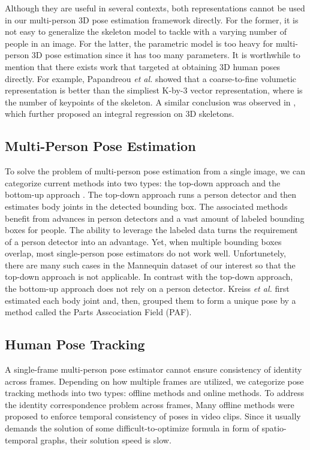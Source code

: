 \documentclass{article}
\begin{document}
Although they are useful in several contexts, both representations
cannot be used in our multi-person 3D pose estimation framework
directly. For the former, it is not easy to generalize the skeleton
model to tackle with a varying number of people in an image. For the
latter, the parametric model is too heavy for multi-person 3D pose
estimation since it has too many parameters.  It is worthwhile to
mention that there exists work that targeted at obtaining 3D human poses
directly.  For example, Papandreou {\em et al.}
\cite{papandreou2017towards} showed that a coarse-to-fine volumetic
representation is better than the simpliest K-by-3 vector
representation, where  is the number of keypoints of the skeleton.  A
similar conclusion was observed in \cite{sun2018integral}, which further
proposed an integral regression on 3D skeletons. 

\subsection{Multi-Person Pose Estimation} 

To solve the problem of multi-person pose estimation from a single
image, we can categorize current methods into two types: the top-down
approach \cite{papandreou2017towards,he2017mask,toshev2014deeppose,
wei2019view, ning2017knowledge,yu2017monocular,xu2020multi} and the bottom-up
approach \cite{kreiss2019pifpaf,cao2017realtime}. The top-down approach
runs a person detector and then estimates body joints in the detected
bounding box. The associated methods benefit from advances in person
detectors and a vast amount of labeled bounding boxes for people.  The
ability to leverage the labeled data turns the requirement of a person
detector into an advantage. Yet, when multiple bounding boxes overlap,
most single-person pose estimators do not work well. Unfortunetely,
there are many such cases in the Mannequin dataset of our interest so
that the top-down approach is not applicable. In contrast with the
top-down approach, the bottom-up approach does not rely on a person
detector.  Kreiss {\em et al.} \cite{kreiss2019pifpaf} first estimated
each body joint and, then, grouped them to form a unique pose by a
method called the Parts Asscociation Field (PAF). 

\subsection{Human Pose Tracking} 

A single-frame multi-person pose estimator cannot ensure consistency of
identity across frames. Depending on how multiple frames are utilized,
we categorize pose tracking methods into two types: offline methods and
online methods. To address the identity correspondence problem across
frames, Many offline methods \cite{insafutdinov2017arttrack,
iqbal2017posetrack, xiao2018simple, zhang2014robust} were proposed to
enforce temporal consistency of poses in video clips. Since it usually
demands the solution of some difficult-to-optimize formula in form of
spatio-temporal graphs, their solution speed is slow. 
\end{document}
